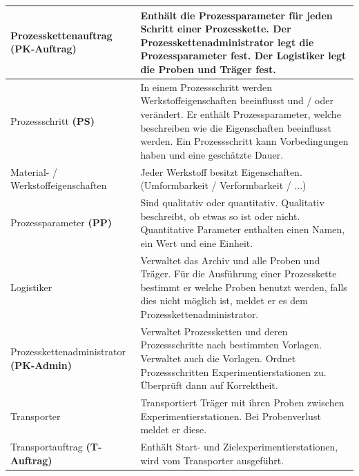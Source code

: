 \documentclass[enabledeprecatedfontcommands,fontsize=12pt,paper=a4,twoside]{scrartcl}
\begin{document}
\begin{longtable}[c]{|p{7cm}|p{8cm}|}
Prozesskettenauftrag \textbf{(PK-Auftrag)}     & Enthält die Prozessparameter für jeden Schritt einer Prozesskette. Der Prozesskettenadministrator legt die Prozessparameter fest. Der Logistiker legt die Proben und Träger fest.                                                                     \\ \hline
Prozessschritt \textbf{(PS)}                     & In einem Prozessschritt werden Werkstoffeigenschaften beeinflusst und / oder verändert. Er enthält Prozessparameter, welche beschreiben wie die Eigenschaften beeinflusst werden. Ein Prozessschritt kann Vorbedingungen haben und eine geschätzte Dauer. \\ \hline
Material- / Werkstoffeigenschaften                              & Jeder Werkstoff besitzt Eigenschaften. (Umformbarkeit / Verformbarkeit / ...)                                                                                                                                                                        \\ \hline
Prozessparameter \textbf{(PP)}                   & Sind qualitativ oder quantitativ. Qualitativ beschreibt, ob etwas so ist oder nicht. Quantitative Parameter enthalten einen Namen, ein Wert und eine Einheit.                                                                                          \\ \hline
Logistiker                                                      & Verwaltet das Archiv und alle Proben und Träger. Für die Ausführung einer Prozesskette bestimmt er welche Proben benutzt werden, falls dies nicht möglich ist, meldet er es dem Prozesskettenadministrator.                                           \\ \hline
Prozesskettenadministrator\textbf{ (PK-Admin)} & Verwaltet Prozessketten und deren Prozessschritte nach bestimmten Vorlagen. Verwaltet auch die Vorlagen. Ordnet Prozessschritten Experimentierstationen zu. Überprüft dann auf Korrektheit.                                                           \\ \hline
Transporter                                                     & Transportiert Träger mit ihren Proben zwischen Experimentierstationen. Bei Probenverlust meldet er diese.                                                                                                                                             \\ \hline
Transportauftrag \textbf{(T-Auftrag)}          & Enthält Start- und Zielexperimentierstationen, wird vom Transporter ausgeführt.                                                                                                                                                                      \\ \hline

\end{longtable}
\end{document}
